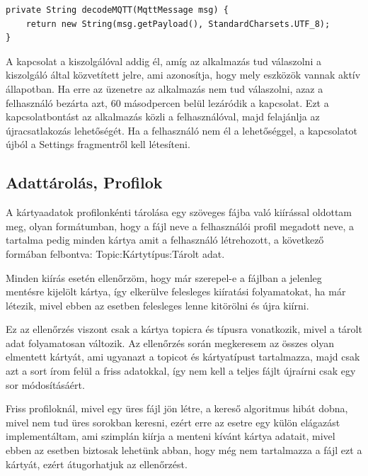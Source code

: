 \documentclass[
]{thesis-ekf}
\theoremstyle{definition}
\theoremstyle{remark}
\begin{document}
\lstset{language=Java}
\begin{lstlisting}[frame=single]
private String decodeMQTT(MqttMessage msg) {
	return new String(msg.getPayload(), StandardCharsets.UTF_8);
}

\end{lstlisting}

A kapcsolat a kiszolgálóval addig él, amíg az alkalmazás tud válaszolni a kiszolgáló által közvetített jelre,
ami azonosítja, hogy mely eszközök vannak aktív állapotban. Ha erre az üzenetre az alkalmazás nem tud válaszolni,
azaz a felhasználó bezárta azt, 60 másodpercen belül lezáródik a kapcsolat. Ezt a kapcsolatbontást az alkalmazás
közli a felhasználóval, majd felajánlja az újracsatlakozás lehetőségét. Ha a felhasználó nem él a lehetőséggel,
a kapcsolatot újból a Settings fragmentről kell létesíteni.

\subsection{Adattárolás, Profilok}
A kártyaadatok profilonkénti tárolása egy szöveges fájba való kiírással oldottam meg, olyan formátumban, hogy a fájl
neve a felhasználói profil megadott neve, a tartalma pedig minden kártya amit a felhasználó létrehozott, a következő
formában felbontva: Topic:Kártytípus:Tárolt adat.

Minden kiírás esetén ellenőrzöm, hogy már szerepel-e a fájlban a jelenleg mentésre kijelölt kártya, így elkerülve
felesleges kiíratási folyamatokat, ha már létezik, mivel ebben az esetben felesleges lenne kitörölni és újra kiírni.

Ez az ellenőrzés viszont csak a kártya topicra és típusra vonatkozik, mivel a tárolt adat folyamatosan változik.
Az ellenőrzés során megkeresem az összes olyan elmentett kártyát, ami ugyanazt a topicot és kártyatípust tartalmazza,
majd csak azt a sort írom felül a friss adatokkal, így nem kell a teljes fájlt újraírni csak egy sor módosításáért.

Friss profiloknál, mivel egy üres fájl jön létre, a kereső algoritmus hibát dobna, mivel nem tud üres sorokban
keresni, ezért erre az esetre egy külön elágazást implementáltam, ami szimplán kiírja a menteni kívánt kártya adatait,
mivel ebben az esetben biztosak lehetünk abban, hogy még nem tartalmazza a fájl ezt a kártyát, ezért átugorhatjuk az
ellenőrzést.
\end{document}
